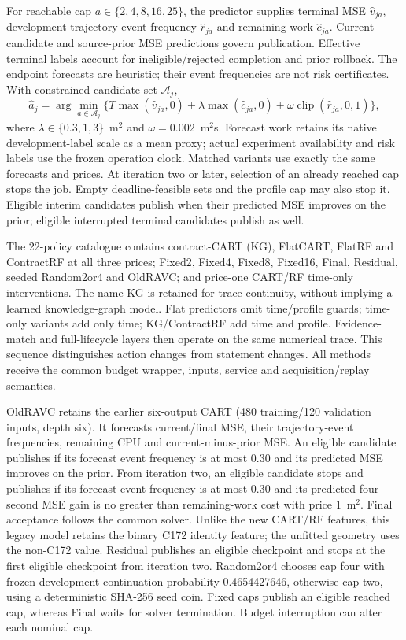 For reachable cap $a\in\{2,4,8,16,25\}$, the predictor supplies terminal MSE $\widehat v_{ja}$, development trajectory-event frequency $\widehat r_{ja}$ and remaining work $\widehat c_{ja}$. Current-candidate and source-prior MSE predictions govern publication. Effective terminal labels account for ineligible/rejected completion and prior rollback. The endpoint forecasts are heuristic; their event frequencies are not risk certificates. With constrained candidate set $\mathcal A_j$,
\begin{equation}
\widehat a_j=\arg\min_{a\in\mathcal A_j}
\{T\max(\widehat v_{ja},0)+\lambda\max(\widehat c_{ja},0)+\omega\operatorname{clip}(\widehat r_{ja},0,1)\},\label{eq:stop-rule}
\end{equation}
where $\lambda\in\{0.3,1,3\}$~m$^2$ and $\omega=0.002$~m$^2$s. Forecast work retains its native development-label scale as a mean proxy; actual experiment availability and risk labels use the frozen operation clock. Matched variants use exactly the same forecasts and prices. At iteration two or later, selection of an already reached cap stops the job. Empty deadline-feasible sets and the profile cap may also stop it. Eligible interim candidates publish when their predicted MSE improves on the prior; eligible interrupted terminal candidates publish as well.

The 22-policy catalogue contains contract-CART (KG), FlatCART, FlatRF and ContractRF at all three prices; Fixed2, Fixed4, Fixed8, Fixed16, Final, Residual, seeded Random2or4 and OldRAVC; and price-one CART/RF time-only interventions. The name KG is retained for trace continuity, without implying a learned knowledge-graph model. Flat predictors omit time/profile guards; time-only variants add only time; KG/ContractRF add time and profile. Evidence-match and full-lifecycle layers then operate on the same numerical trace. This sequence distinguishes action changes from statement changes. All methods receive the common budget wrapper, inputs, service and acquisition/replay semantics.

OldRAVC retains the earlier six-output CART (480 training/120 validation inputs, depth six). It forecasts current/final MSE, their trajectory-event frequencies, remaining CPU and current-minus-prior MSE. An eligible candidate publishes if its forecast event frequency is at most 0.30 and its predicted MSE improves on the prior. From iteration two, an eligible candidate stops and publishes if its forecast event frequency is at most 0.30 and its predicted four-second MSE gain is no greater than remaining-work cost with price 1~m$^2$. Final acceptance follows the common solver. Unlike the new CART/RF features, this legacy model retains the binary C172 identity feature; the unfitted geometry uses the non-C172 value. Residual publishes an eligible checkpoint and stops at the first eligible checkpoint from iteration two. Random2or4 chooses cap four with frozen development continuation probability 0.4654427646, otherwise cap two, using a deterministic SHA-256 seed coin. Fixed caps publish an eligible reached cap, whereas Final waits for solver termination. Budget interruption can alter each nominal cap.

